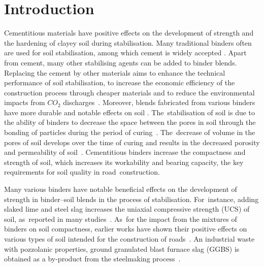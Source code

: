 \documentclass[electronics,article,accept,pdftex,moreauthors]{Definitions/mdpi}
\begin{document}
\section{Introduction}

Cementitious materials have positive effects on the development of strength and the hardening of clayey soil during stabilisation. {Many} traditional binders often are used for soil stabilisation, {among which} cement is{ }widely{ accepted} \cite{Moh,Lindh2021a,Lapointe,ZhangTao}. Apart from cement, many other stabilising agents {can be} added to binder blends. Replacing the cement by other materials aims to enhance the technical performance of soil stabilisation, {to} increase the economic efficiency of the construction process through cheaper materials and {to} reduce {the} environmental impacts from $CO_2$ discharges~\cite{Joulazadeh,Yietal2014,Renjith}. Moreover,{ }blends fabricated from various binders {have} more durable and notable {effects on soil} \cite{Lindh2022b,Mariri,Fasihnikoutalab}. The~stabilisation of soil is due to the ability of binders to decrease the space between the pores in soil through the bonding of particles during the period of curing~\cite{Lindh2021b,Bahrekazemi}. The~decrease of volume in the pores of soil develops over the time of curing and results in the decreased porosity and permeability of soil~\cite{Lindh2022b,Mariri,Fasihnikoutalab}. {Cementitious} binders increase the compactness and strength of soil, which{ }increases its workability and bearing capacity, the key requirements for soil quality in road~construction.	

Many various binders have notable beneficial effects on the development of strength in binder--soil blends in the process of stabilisation. For~instance, adding slaked lime and steel slag increases the uniaxial compressive strength (UCS) of soil, as~reported in many studies~\cite{Lindh2021b,Bahrekazemi,Lindh2022c}. As~for the impact from the mixtures of binders on soil compactness, earlier works have shown their positive effects on various types of soil intended for the construction of roads~\cite{Dahlin,Nordmark,Kallen}. {An industrial waste} with pozzolanic properties, {ground granulated blast furnace slag (GGBS) is obtained }as a by-product from the steelmaking process~\cite{Aziz}. 
\end{document}
